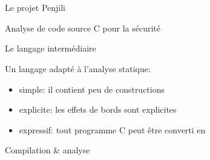 \section{\newspeak}

\begin{frame}{Le projet Penjili}

Analyse de code source C pour la sécurité

\end{frame}

\begin{frame}{Le langage intermédiaire \newspeak}

Un langage adapté à l'analyse statique:

\begin{itemize}
\item simple: il contient peu de constructions
\item explicite: les effets de bords sont explicites
\item expressif: tout programme C peut être converti en \newspeak
\end{itemize}

\end{frame}

\begin{frame}{Compilation \& analyse}




\end{frame}

